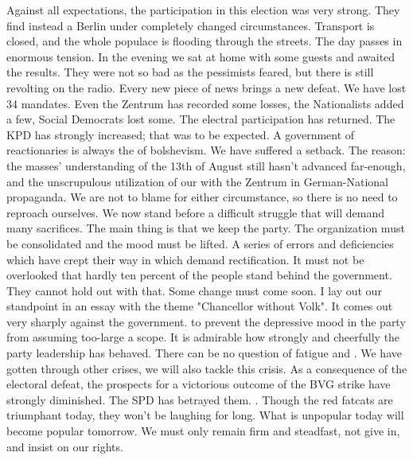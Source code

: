 
Against all expectations, the participation in this election was very strong. They find instead a Berlin under completely changed circumstances. Transport is closed, and the whole populace is flooding through the streets. The day passes in enormous tension. In the evening we sat at home with some guests and awaited the results. They were not so bad as the pessimists feared, but there is still revolting  on the radio. Every new piece of news brings a new defeat. We have lost 34 mandates. Even the Zentrum has recorded some losses, the Nationalists added a few, Social Democrats lost some. The electral participation has returned. The KPD has strongly increased; that was to be expected. A government of reactionaries is always the  of bolshevism. We have suffered a setback. The reason: the masses' understanding of the 13th of August still hasn't advanced far-enough, and the unscrupulous utilization of our  with the Zentrum in German-National propaganda. We are not to blame for either circumstance, so there is no need to reproach ourselves. We now stand before a difficult struggle that will demand many sacrifices. The main thing is that we keep the party. The organization must be consolidated and the mood must be lifted. A series of errors and deficiencies which have crept their way in which demand rectification. It must not be overlooked that hardly ten percent of the people stand behind 
the government. They cannot hold out with that. Some change must come soon. I lay out our standpoint in an essay with the theme "Chancellor without Volk". It comes out very sharply against the government.  to prevent the depressive mood in the party from assuming too-large a scope. It is admirable how strongly and cheerfully the party leadership has behaved. There can be no question of fatigue and . We have gotten through other crises, we will also tackle this crisis. As a consequence of the electoral defeat, the prospects for a victorious outcome of the BVG strike have strongly diminished. The SPD has betrayed them. . Though the red fatcats are triumphant today, they won't be laughing for long. What is unpopular today will become popular tomorrow. We must only remain firm and steadfast, not give in, and insist on our rights.

